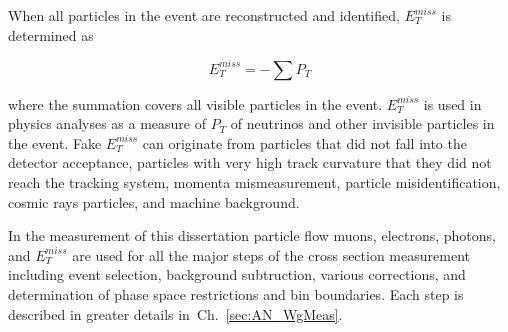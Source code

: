 When all particles in the event are reconstructed and identified, $E_T^{miss}$ is determined as

\begin{equation}\label{eq:MET}
  E_T^{miss} = - \sum P_T
\end{equation}

where the summation covers all visible particles in the event. $E_T^{miss}$ is used in physics analyses as a measure of $P_T$ of neutrinos and other invisible particles in the event. Fake $E_T^{miss}$ can originate from particles that did not fall into the detector acceptance, particles with very high track curvature that they did not reach the tracking system, momenta mismeasurement, particle misidentification, cosmic rays particles, and machine background.

In the measurement of this dissertation particle flow muons, electrons, photons, and $E_T^{miss}$ are used for all the major steps of the cross section measurement including event selection, background subtruction, various corrections, and determination of phase space restrictions and bin boundaries. Each step is described in greater details in~Ch.~\ref{sec:AN_WgMeas}. 


